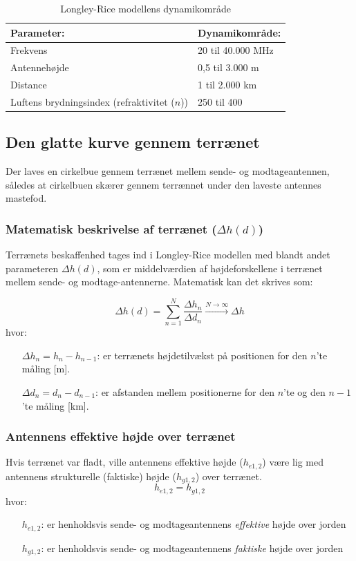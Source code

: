 \begin{table}[h]
 \centering
 \begin{tabular}{ll}
   Parameter:                                   & Dynamikområde:\\
   \hline
   Frekvens                                     & 20 til 40.000 MHz\\
   Antennehøjde                                 & 0,5 til 3.000 m \\
   Distance                                     & 1 til 2.000 km \\
   Luftens brydningsindex (refraktivitet ($n$)) & 250 til 400 \\
 \end{tabular}
 \caption{Longley-Rice modellens dynamikområde}
 \label{tab:lr-range}
\end{table}
\FloatBarrier
\subsection{Den glatte kurve gennem terrænet}
Der laves en cirkelbue gennem terrænet mellem sende- og modtageantennen, således at cirkelbuen skærer gennem terrænnet under den laveste antennes mastefod. 

\subsubsection{Matematisk beskrivelse af terrænet ($\Delta h(d)$)}
Terrænets beskaffenhed tages ind i Longley-Rice modellen med blandt andet parameteren $\Delta h(d)$, som er middelværdien af højdeforskellene i terrænet mellem sende- og modtage-antennerne. Matematisk kan det skrives som:

\begin{equation}
\Delta h(d) = \sum\limits_{n=1}^N \frac{\Delta h_n}{\Delta d_n} \xrightarrow {N\rightarrow \infty} \Delta h
\end{equation}
hvor:
\begin{itemize}
	\item [$\Delta h_n = h_n - h_{n-1}$:] er terrænets højdetilvækst på positionen for den $n$'te måling [m]. 
	\item [$\Delta d_n = d_n - d_{n-1}$:] er afstanden mellem positionerne for den $n$'te og den $n-1$'te måling [km]. 
\end{itemize}


\subsubsection{Antennens effektive højde over terrænet}
Hvis terrænet var fladt, ville antennens effektive højde ($h_{e1,2}$) være lig med antennens strukturelle (faktiske) højde ($h_{g1,2}$) over terrænet.  
\begin{equation}
h_{e1,2} = h_{g1,2}
\end{equation}
hvor:
\begin{itemize}
	\item [$h_{e1,2}$:] er henholdsvis sende- og modtageantennens \emph{effektive} højde over jorden 
	\item [$h_{g1,2}$:] er henholdsvis sende- og modtageantennens \emph{faktiske} højde over jorden 
\end{itemize}

